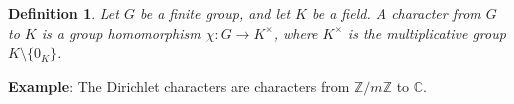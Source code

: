 \documentclass[12pt]{article}
\newtheorem*{defn}{Definition}
\newcommand{\Ints}{\mathbb{Z}}
\newcommand{\Complex}{\mathbb{C}}
\begin{document}
\begin{defn}
Let $G$ be a finite group, and let $K$ be a field. A character from $G$ to $K$ is a group homomorphism $\chi\colon G\to K^\times$, where $K^\times$ is the multiplicative group $K\setminus\{0_K\}$.
\end{defn}

{\bf Example}:
The Dirichlet characters are characters from $\Ints/m\Ints$ to $\Complex$.
\end{document}

